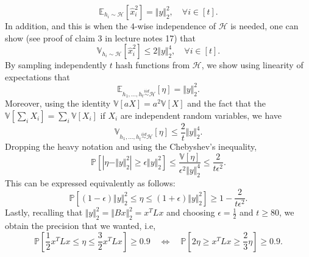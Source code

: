 \documentclass[10pt,usenames,dvipsnames]{article}
\newcommand{\Pbb}{\mathbb{P}}
\newcommand{\Ebb}{\mathbb{E}}
\newcommand{\Vbb}{\mathbb{V}}
\newenvironment{exercise}[2][Exercise]{\begin{trivlist}
  \item[\hskip \labelsep {\bfseries #1}\hskip \labelsep {\bfseries #2.}]}{\end{trivlist}}
\begin{document}
\begin{exercise}{3b}
$$
\Ebb_{h_i \sim \mathcal{H}}[\hat{x}_i^2] = \Vert y \Vert_2^2, \quad \forall i \in [t].
$$
In addition, and this is when the $4$-wise independence of $\mathcal{H}$ is needed, one can show (see proof of claim 3 in lecture notes 17) that
$$
\Vbb_{h_i \sim \mathcal{H}}[\hat{x}_i^2]\leq2\Vert y \Vert_2^4, \quad \forall i \in [t].
$$
By sampling independently $t$ hash functions from $\mathcal{H}$, we show using linearity of expectations that
$$
\Ebb_{h_1,...,h_t \overset{iid}{\sim} \mathcal{H}}\left[\eta\right] = \Vert y \Vert_2^2.
$$
Moreover, using the identity $\Vbb[aX] = a^2 \Vbb[X]$ and the fact that the $\Vbb[\sum_{i}X_i] = \sum_i\Vbb[X_i]$ if $X_i$ are independent random variables, we have
$$
\Vbb_{h_1,...,h_t \overset{iid}{\sim} \mathcal{H}}\left[\eta\right]\leq\frac{2}{t}\Vert y \Vert_2^4.
$$
Dropping the heavy notation and using the Chebyshev's inequality, 
$$\Pbb\left[|\eta-\Vert y \Vert_2^2| \geq \epsilon\Vert y \Vert_2^2\right] \leq \frac{\Vbb[\eta]}{\epsilon^2\Vert y \Vert_2^4} \leq \frac{2}{t\epsilon^2}.$$
This can be expressed equivalently as follows:
$$
\Pbb\left[(1-\epsilon)\Vert y \Vert_2^2 \leq \eta \leq (1+\epsilon) \Vert y \Vert_2^2 \right] \geq 1-\frac{2}{t\epsilon^2}.
$$
Lastly, recalling that $\Vert y \Vert_2^2 = \Vert Bx\Vert_2^2 = x^TLx$ and choosing $\epsilon = \frac{1}{2}$ and $t\geq 80$, we obtain the precision that we wanted, i.e,
$$
\Pbb\left[\frac{1}{2}x^TLx \leq \eta \leq \frac{3}{2}x^TLx \right] \geq 0.9 \quad \Longleftrightarrow \quad \Pbb\left[2 \eta \geq x^TLx \geq \frac{2}{3}\eta\right] \geq 0.9.$$
  \end{exercise}
 
\end{document}
